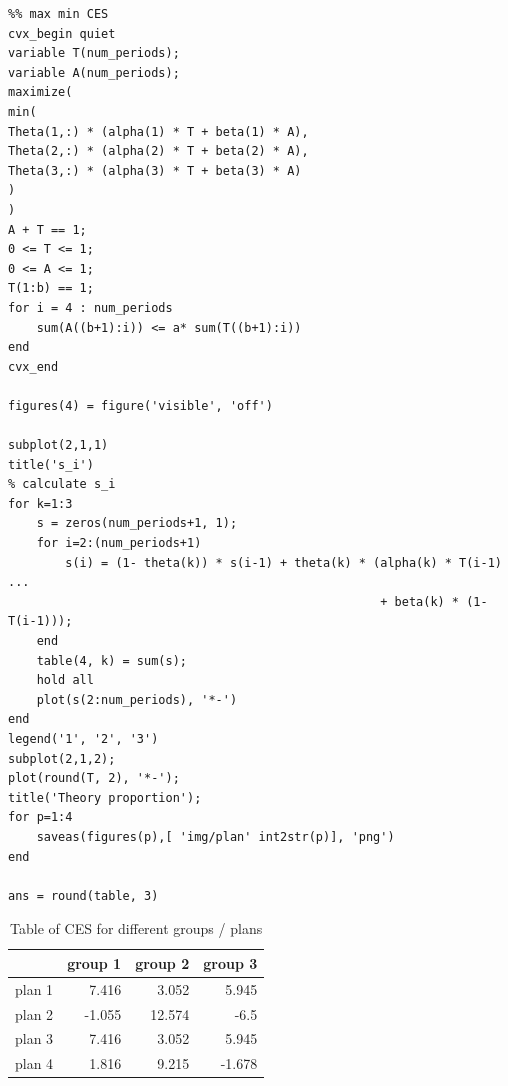 \documentclass[11pt]{article}
\begin{document}
\begin{verbatim}
%% max min CES
cvx_begin quiet
variable T(num_periods);
variable A(num_periods);
maximize(
min(
Theta(1,:) * (alpha(1) * T + beta(1) * A),
Theta(2,:) * (alpha(2) * T + beta(2) * A),
Theta(3,:) * (alpha(3) * T + beta(3) * A)
)
)
A + T == 1;
0 <= T <= 1;
0 <= A <= 1;
T(1:b) == 1;
for i = 4 : num_periods
    sum(A((b+1):i)) <= a* sum(T((b+1):i))
end
cvx_end

figures(4) = figure('visible', 'off')

subplot(2,1,1)
title('s_i')
% calculate s_i
for k=1:3
    s = zeros(num_periods+1, 1);
    for i=2:(num_periods+1)
        s(i) = (1- theta(k)) * s(i-1) + theta(k) * (alpha(k) * T(i-1) ...
                                                    + beta(k) * (1-T(i-1)));
    end
    table(4, k) = sum(s);
    hold all
    plot(s(2:num_periods), '*-')
end
legend('1', '2', '3')
subplot(2,1,2);
plot(round(T, 2), '*-');
title('Theory proportion');
for p=1:4
    saveas(figures(p),[ 'img/plan' int2str(p)], 'png')
end

ans = round(table, 3)
\end{verbatim}






\begin{table}[htb]
\caption{Table of CES for different groups / plans}
\centering
\begin{tabular}{lrrr}
 & group 1 & group 2 & group 3\\
\hline
plan 1 & 7.416 & 3.052 & 5.945\\
plan 2 & -1.055 & 12.574 & -6.5\\
plan 3 & 7.416 & 3.052 & 5.945\\
plan 4 & 1.816 & 9.215 & -1.678\\
\end{tabular}
\end{table}
\end{document}
